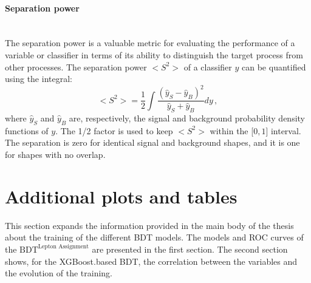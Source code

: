 


 
\paragraph{Separation power}\mbox{}\\
The separation power is a valuable metric for evaluating the performance 
of a variable or classifier in terms of its ability to distinguish the target process 
from other processes. The separation power $<S^{2}>$ of a classifier $y$ can 
be quantified using the integral:
\begin{equation}\label{eq:Appendix:BDT:SeparationPower}
	<S^{2}> = \frac{1}{2}\int \frac{(\hat{y}_{S} - \hat{y}_{B})^{2}}{\hat{y}_{S}+\hat{y}_{B}}dy \, ,
\end{equation}
where $\hat{y}_{S}$ and $\hat{y}_{B}$ are, respectively, the signal and background probability 
density functions of $y$.  The 1/2 factor is used to keep $<S^{2}>$ within the [$0, 1$] interval.
The separation is zero for identical signal and background shapes, and 
it is one for shapes with no overlap.



\section{Additional plots and tables}
\label{sec:BDT:AdditionalMaterial}
This section expands the information provided in the main body of the thesis 
about the training of the different BDT models. The models and ROC curves
of the $\text{BDT}^{\text{Lepton Assignment}}$ are presented in the first
section. The second section shows, for
the XGBoost.based BDT, the correlation between the variables and the evolution of the training.


